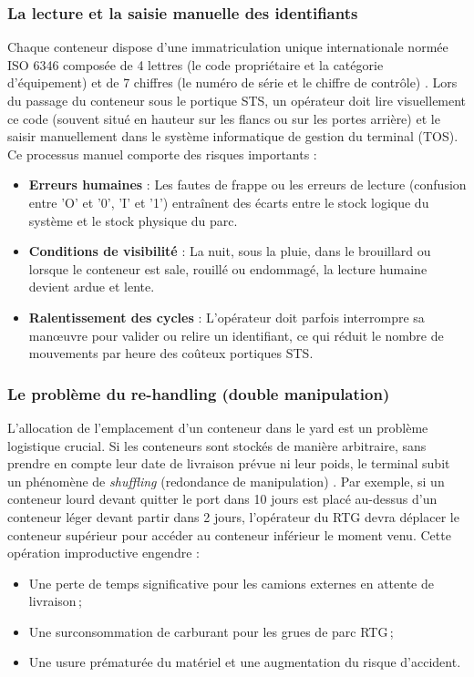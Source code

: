 \documentclass[12pt,a4paper]{article}
\begin{document}
\subsubsection{La lecture et la saisie manuelle des identifiants}
Chaque conteneur dispose d'une immatriculation unique internationale normée ISO 6346 composée de 4 lettres (le code propriétaire et la catégorie d'équipement) et de 7 chiffres (le numéro de série et le chiffre de contrôle) \cite{ISO6346}. Lors du passage du conteneur sous le portique \ac{STS}, un opérateur doit lire visuellement ce code (souvent situé en hauteur sur les flancs ou sur les portes arrière) et le saisir manuellement dans le système informatique de gestion du terminal (\ac{TOS}).
Ce processus manuel comporte des risques importants :
\begin{itemize}
  \item \textbf{Erreurs humaines} : Les fautes de frappe ou les erreurs de lecture (confusion entre 'O' et '0', 'I' et '1') entraînent des écarts entre le stock logique du système et le stock physique du parc.
  \item \textbf{Conditions de visibilité} : La nuit, sous la pluie, dans le brouillard ou lorsque le conteneur est sale, rouillé ou endommagé, la lecture humaine devient ardue et lente.
  \item \textbf{Ralentissement des cycles} : L'opérateur doit parfois interrompre sa manœuvre pour valider ou relire un identifiant, ce qui réduit le nombre de mouvements par heure des coûteux portiques \ac{STS}.
\end{itemize}

\subsubsection{Le problème du re-handling (double manipulation)}
L'allocation de l'emplacement d'un conteneur dans le yard est un problème logistique crucial. Si les conteneurs sont stockés de manière arbitraire, sans prendre en compte leur date de livraison prévue ni leur poids, le terminal subit un phénomène de \textit{shuffling} (redondance de manipulation) \cite{Caserta2011}.
Par exemple, si un conteneur lourd devant quitter le port dans 10 jours est placé au-dessus d'un conteneur léger devant partir dans 2 jours, l'opérateur du \ac{RTG} devra déplacer le conteneur supérieur pour accéder au conteneur inférieur le moment venu. Cette opération improductive engendre :
\begin{itemize}
  \item Une perte de temps significative pour les camions externes en attente de livraison\,;
  \item Une surconsommation de carburant pour les grues de parc \ac{RTG}\,;
  \item Une usure prématurée du matériel et une augmentation du risque d'accident.
\end{itemize}
\end{document}
